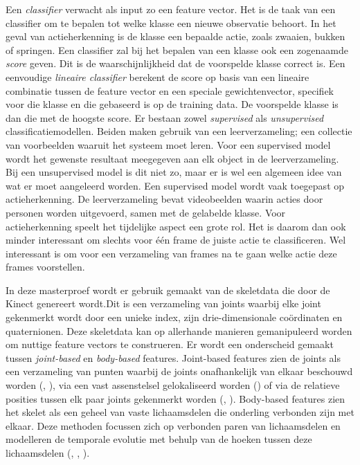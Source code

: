 Een \textit{classifier} verwacht als input zo een feature vector. Het is de taak van een classifier om te bepalen tot welke klasse een nieuwe observatie behoort. In het geval van actieherkenning is de klasse een bepaalde actie, zoals zwaaien, bukken of springen. Een classifier zal bij het bepalen van een klasse ook een zogenaamde \textit{score} geven. Dit is de waarschijnlijkheid dat de voorspelde klasse correct is. Een eenvoudige \textit{lineaire classifier} berekent de score op basis van een lineaire combinatie tussen de feature vector en een speciale gewichtenvector, specifiek voor die klasse en die gebaseerd is op de training data. De voorspelde klasse is dan die met de hoogste score. Er bestaan zowel \textit{supervised} als \textit{unsupervised} classificatiemodellen. Beiden maken gebruik van een leerverzameling; een collectie van voorbeelden waaruit het systeem moet leren. Voor een supervised model wordt het gewenste resultaat meegegeven aan elk object in de leerverzameling. Bij een unsupervised model is dit niet zo, maar er is wel een algemeen idee van wat er moet aangeleerd worden. Een supervised model wordt vaak toegepast op actieherkenning. De leerverzameling bevat videobeelden waarin acties door personen worden uitgevoerd, samen met de gelabelde klasse. Voor actieherkenning speelt het tijdelijke aspect een grote rol. Het is daarom dan ook minder interessant om slechts voor één frame de juiste actie te classificeren. Wel interessant is om voor een verzameling van frames na te gaan welke actie deze frames voorstellen. 


In deze masterproef wordt er gebruik gemaakt van de skeletdata die door de Kinect genereert wordt.Dit is een verzameling van joints waarbij elke joint gekenmerkt wordt door een unieke index, zijn drie-dimensionale coördinaten en quaternionen. Deze skeletdata kan op allerhande manieren gemanipuleerd worden om nuttige feature vectors te construeren. Er wordt een onderscheid gemaakt tussen \textit{joint-based} en \textit{body-based} features. Joint-based features zien de joints als een verzameling van punten waarbij de joints onafhankelijk van elkaar beschouwd worden (\cite{Hussein2011}, \cite{Lv2006}), via een vast assenstelsel gelokaliseerd worden (\cite{Xia2012}) of via de relatieve posities tussen elk paar joints gekenmerkt worden (\cite{Wang2012b}, \cite{Yang2012}). Body-based features zien het skelet als een geheel van vaste lichaamsdelen die onderling verbonden zijn met elkaar. Deze methoden focussen zich op verbonden paren van lichaamsdelen en modelleren de temporale evolutie met behulp van de hoeken tussen deze lichaamsdelen (\cite{Ofli2012}, \cite{Ohn-Bar2013}, \cite{Deboeverie2016}). 

